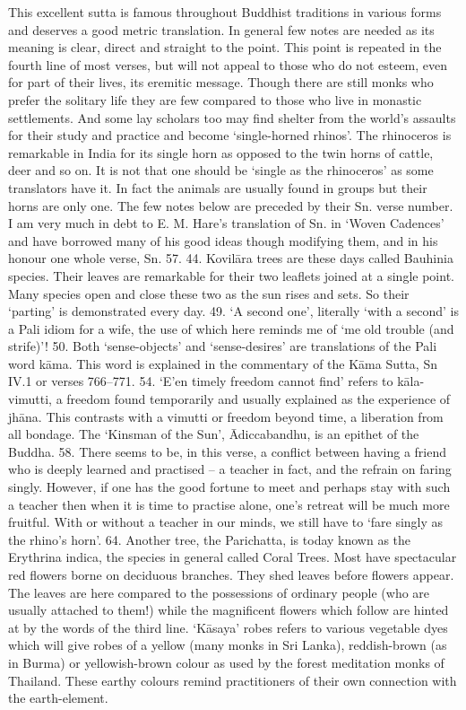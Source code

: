 This excellent sutta is famous throughout Buddhist traditions in various forms and deserves a good metric translation. In general few notes are needed as its meaning is clear, direct and straight to the point. This point is repeated in the fourth line of most verses, but will not appeal to those who do not esteem, even for part of their lives, its eremitic message. Though there are still monks who prefer the solitary life they are few compared to those who live in monastic settlements. And some lay scholars too may find shelter from the world's assaults for their study and practice and become `single-horned rhinos'. The rhinoceros is remarkable in India for its single horn as opposed to the twin horns of cattle, deer and so on. It is not that one should be `single as the rhinoceros' as some translators have it. In fact the animals are usually found in groups but their horns are only one.
The few notes below are preceded by their Sn. verse number.
I am very much in debt to E. M. Hare's translation of Sn. in `Woven Cadences' and have borrowed many of his good ideas though modifying them, and in his honour one whole verse, Sn. 57.
44. Kovil\=ara trees are these days called Bauhinia species. Their leaves are remarkable for their two leaflets joined at a single point. Many species open and close these two as the sun rises and sets. So their `parting' is demonstrated every day.
49. `A second one', literally `with a second' is a Pali idiom for a wife, the use of which here reminds me of `me old trouble (and strife)'!
50. Both `sense-objects' and `sense-desires' are translations of the Pali word k\=ama. This word is explained in the commentary of the K\=ama Sutta, Sn IV.1 or verses 766–771.
54. `E'en timely freedom cannot find' refers to k\=ala-vimutti, a freedom found temporarily and usually explained as the experience of jh\=ana. This contrasts with a vimutti or freedom beyond time, a liberation from all bondage. The `Kinsman of the Sun', Ādiccabandhu, is an epithet of the Buddha.
58. There seems to be, in this verse, a conflict between having a friend who is deeply learned and practised – a teacher in fact, and the refrain on faring singly. However, if one has the good fortune to meet and perhaps stay with such a teacher then when it is time to practise alone, one's retreat will be much more fruitful. With or without a teacher in our minds, we still have to `fare singly as the rhino's horn'.
64. Another tree, the Parichatta, is today known as the Erythrina indica, the species in general called Coral Trees. Most have spectacular red flowers borne on deciduous branches. They shed leaves before flowers appear. The leaves are here compared to the possessions of ordinary people (who are usually attached to them!) while the magnificent flowers which follow are hinted at by the words of the third line. `K\=asaya' robes refers to various vegetable dyes which will give robes of a yellow (many monks in Sri Lanka), reddish-brown (as in Burma) or yellowish-brown colour as used by the forest meditation monks of Thailand. These earthy colours remind practitioners of their own connection with the earth-element.
